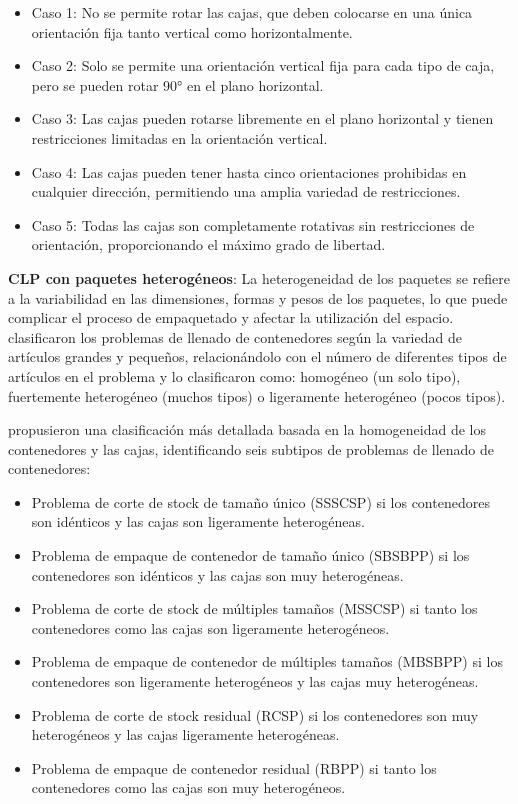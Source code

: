\begin{itemize}
    \item Caso 1: No se permite rotar las cajas, que deben colocarse en una única orientación fija tanto vertical como horizontalmente.
    \item Caso 2: Solo se permite una orientación vertical fija para cada tipo de caja, pero se pueden rotar 90° en el plano horizontal.
    \item Caso 3: Las cajas pueden rotarse libremente en el plano horizontal y tienen restricciones limitadas en la orientación vertical.
    \item Caso 4: Las cajas pueden tener hasta cinco orientaciones prohibidas en cualquier dirección, permitiendo una amplia variedad de restricciones.
    \item Caso 5: Todas las cajas son completamente rotativas sin restricciones de orientación, proporcionando el máximo grado de libertad.
\end{itemize}

\textbf{CLP con paquetes heterogéneos}: La heterogeneidad de los paquetes se refiere a la variabilidad en las dimensiones, formas y pesos de los paquetes, lo que puede complicar el proceso de empaquetado y afectar la utilización del espacio. \textcite{WASCHER20071109} clasificaron los problemas de llenado de contenedores según la variedad de artículos grandes y pequeños, relacionándolo con el número de diferentes tipos de artículos en el problema y lo clasificaron como: homogéneo (un solo tipo), fuertemente heterogéneo (muchos tipos) o ligeramente heterogéneo (pocos tipos).

\textcite{zhao2016comparative} propusieron una clasificación más detallada basada en la homogeneidad de los contenedores y las cajas, identificando seis subtipos de problemas de llenado de contenedores:

\begin{itemize}
    \item Problema de corte de stock de tamaño único (SSSCSP) si los contenedores son idénticos y las cajas son ligeramente heterogéneas.
    \item Problema de empaque de contenedor de tamaño único (SBSBPP) si los contenedores son idénticos y las cajas son muy heterogéneas.
    \item Problema de corte de stock de múltiples tamaños (MSSCSP) si tanto los contenedores como las cajas son ligeramente heterogéneos.
    \item Problema de empaque de contenedor de múltiples tamaños (MBSBPP) si los contenedores son ligeramente heterogéneos y las cajas muy heterogéneas.
    \item Problema de corte de stock residual (RCSP) si los contenedores son muy heterogéneos y las cajas ligeramente heterogéneas.
    \item Problema de empaque de contenedor residual (RBPP) si tanto los contenedores como las cajas son muy heterogéneos.
\end{itemize}

